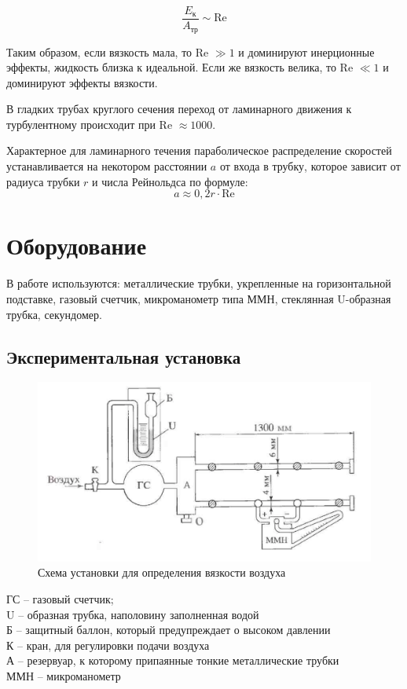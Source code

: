 \documentclass[a4paper,12pt]{article}
\theoremstyle{plain} %
\theoremstyle{definition} %
\theoremstyle{remark} %
\begin{document}
\[\frac{E_\text{к}}{A_\text{тр}}\sim \text{Re}\]

Таким образом, если вязкость мала, то Re $\gg 1$ и доминируют инерционные эффекты, жидкость близка к идеальной. Если же вязкость велика, то Re $\ll 1$ и доминируют эффекты вязкости.

В гладких трубах круглого сечения переход от ламинарного движения к турбулентному происходит при Re $\approx 1000$.

Характерное для ламинарного течения параболическое распределение скоростей устанавливается на некотором расстоянии $a$ от входа в трубку, которое зависит от радиуса трубки $r$  и числа Рейнольдса по формуле:
\begin{equation}
a \approx 0,2r \cdot \text{Re}
\end{equation}
\section{Оборудование}
В работе используются: металлические трубки, укрепленные на горизонтальной подставке, газовый счетчик, микроманометр типа ММН, стеклянная U-образная трубка, секундомер.
\subsection{Экспериментальная установка}
\begin{figure}[h]
	\begin{center}
		\includegraphics[width=\linewidth]{2}
		\caption{Схема установки для определения вязкости воздуха}
	\end{center}
\end{figure}
\noindent ГС -- газовый счетчик;\\
U -- образная трубка, наполовину заполненная водой\\
Б -- защитный баллон, который предупреждает о высоком давлении\\
К -- кран, для регулировки подачи воздуха\\
А -- резервуар, к которому припаянные тонкие металлические трубки\\
ММН -- микроманометр
\end{document}

